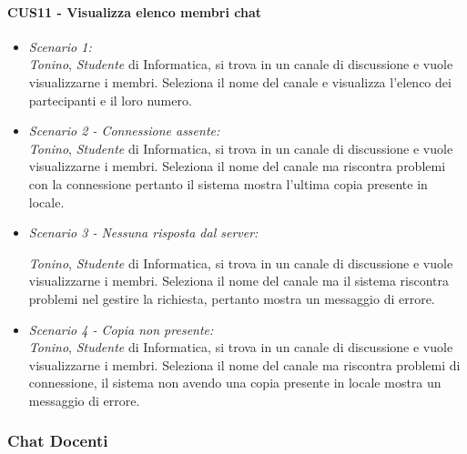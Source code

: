 \paragraph{CUS11 - Visualizza elenco membri chat\\}
\begin{itemize}
	\item \textit{Scenario 1:\\}
	\textit{Tonino}, \textit{Studente} di Informatica, si trova in un canale di discussione e vuole visualizzarne i membri. Seleziona il nome del canale e visualizza l’elenco dei partecipanti e il loro numero.\\
	
	\item \textit{Scenario 2 - Connessione assente:\\}
	\textit{Tonino}, \textit{Studente} di Informatica, si trova in un canale di discussione e vuole visualizzarne i membri. Seleziona il nome del canale ma riscontra problemi con la connessione pertanto il sistema mostra l’ultima copia presente in locale.\\
	
	\item \textit{Scenario 3 - Nessuna risposta dal server:\\}
	
	\textit{Tonino}, \textit{Studente} di Informatica, si trova in un canale di discussione e vuole visualizzarne i membri. Seleziona il nome del canale ma il sistema riscontra problemi nel gestire la richiesta, pertanto mostra un messaggio di errore.\\
	
	\item \textit{Scenario 4 - Copia non presente:\\}
	\textit{Tonino}, \textit{Studente} di Informatica, si trova in un canale di discussione e vuole visualizzarne i membri. Seleziona il nome del canale ma riscontra problemi di connessione, il sistema non avendo una copia presente in locale mostra un messaggio di errore.\\
\end{itemize}

\subsubsection{Chat Docenti}
